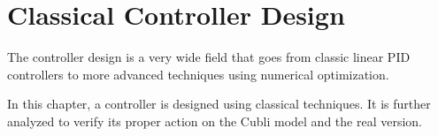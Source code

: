 \chapter{Classical Controller Design}\label{chap:controllerDesign}
The controller design is a very wide field that goes from classic linear PID controllers to more advanced techniques using numerical optimization.

In this chapter, a controller is designed using classical techniques. It is further analyzed to verify its proper action on the Cubli model and the real version.

